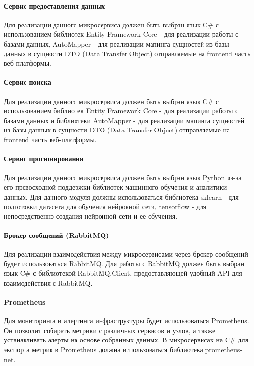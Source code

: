 \paragraph{Сервис предоставления данных}

Для реализации данного микросервиса должен быть выбран язык C\# с использованием библиотек Entity Framework Core - для реализации работы с базами данных, AutoMapper - для реализации мапинга сущностей из базы данных в сущности DTO (Data Transfer Object) отправляемые на frontend часть веб-платформы.

\paragraph{Сервис поиска}

Для реализации данного микросервиса должен быть выбран язык C\# с использованием библиотек Entity Framework Core - для реализации работы с базами данных и библиотеки AutoMapper - для реализации мапинга сущностей из базы данных в сущности DTO (Data Transfer Object) отправляемые на frontend часть веб-платформы.

\paragraph{Сервис прогнозирования}

Для реализации данного микросервиса должен быть выбран язык Python из-за его превосходной поддержки библиотек машинного обучения и аналитики данных. Для данного модуля должны использоваться библиотека sklearn - для подготовки датасета для обучения нейронной сети, tensorflow - для непосредственно создания нейронной сети и ее обучения.

\paragraph{Брокер сообщений (RabbitMQ)}

Для реализации взаимодействия между микросервисами через брокер сообщений будет использоваться RabbitMQ. Для работы с RabbitMQ должен быть выбран язык C\# с библиотекой RabbitMQ.Client, предоставляющей удобный API для взаимодействия с RabbitMQ.

\paragraph{Prometheus}

Для мониторинга и алертинга инфраструктуры будет использоваться Prometheus. Он позволит собирать метрики с различных сервисов и узлов, а также устанавливать алерты на основе собранных данных. В микросервисах на C\# для экспорта метрик в Prometheus должна использоваться библиотека prometheus-net.

